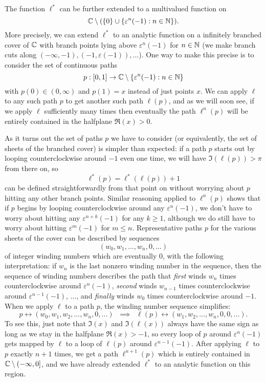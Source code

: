 \documentclass[letterpaper,11pt]{article}
\begin{document}
The function $\ell^*$ can be further extended to a multivalued function on
\[
\mathbb{C} \setminus (\{0\}\cup\{\varepsilon^n(-1) : n \in \mathbb{N}\}).
\]
More precisely, we can extend $\ell^*$ to an analytic function on a infinitely branched cover of $\mathbb{C}$ with branch points lying above $\varepsilon^n(-1)$ for $n \in \mathbb{N}$ (we make branch cuts along $(-\infty,-1), (-1,\varepsilon(-1)), ...$). One way to make this precise is to consider the set of continuous paths
\[
p : [0,1] \rightarrow \mathbb{C}\setminus \{\varepsilon^n(-1) : n \in \mathbb{N}\}
\]
with $p(0) \in (0,\infty)$ and $p(1) = x$ instead of just points $x$. We can apply $\ell$ to any such path $p$ to get another such path $\ell(p)$, and as we will soon see, if we apply $\ell$ sufficiently many times then eventually the path $\ell^n(p)$ will be entirely contained in the halfplane $\Re(x) > 0$.

As it turns out the set of paths $p$ we have to consider (or equivalently, the set of sheets of the branched cover) is simpler than expected: if a path $p$ starts out by looping counterclockwise around $-1$ even one time, we will have $\Im(\ell(p)) > \pi$ from there on, so
\[
\ell^*(p) = \ell^*(\ell(p)) + 1
\]
can be defined straightforwardly from that point on without worrying about $p$ hitting any other branch points. Similar reasoning applied to $\ell^n(p)$ shows that if $p$ begins by looping counterclockwise around any $\varepsilon^n(-1)$, we don't have to worry about hitting any $\varepsilon^{n+k}(-1)$ for any $k \ge 1$, although we do still have to worry about hitting $\varepsilon^m(-1)$ for $m \le n$. Representative paths $p$ for the various sheets of the cover can be described by sequences
\[
(w_0, w_1, ..., w_n, 0, ...)
\]
of integer winding numbers which are eventually $0$, with the following interpretation: if $w_n$ is the last nonzero winding number in the sequence, then the sequence of winding numbers describes the path that \emph{first} winds $w_n$ times counterclockwise around $\varepsilon^n(-1)$, \emph{second} winds $w_{n-1}$ times counterclockwise around $\varepsilon^{n-1}(-1)$, ..., and \emph{finally} winds $w_0$ times counterclockwise around $-1$. When we apply $\ell$ to a path $p$, the winding number sequence simplifies:
\[
p \leftrightarrow (w_0, w_1, w_2, ..., w_n, 0, ...) \;\; \implies \;\; \ell(p) \leftrightarrow (w_1, w_2, ..., w_n, 0, 0, ...).
\]
To see this, just note that $\Im(x)$ and $\Im(\ell(x))$ always have the same sign as long as we stay in the halfplane $\Re(x) > -1$, so every loop of $p$ around $\varepsilon^n(-1)$ gets mapped by $\ell$ to a loop of $\ell(p)$ around $\varepsilon^{n-1}(-1)$. After applying $\ell$ to $p$ exactly $n+1$ times, we get a path $\ell^{n+1}(p)$ which is entirely contained in $\mathbb{C} \setminus (-\infty,0]$, and we have already extended $\ell^*$ to an analytic function on this region.
\end{document}
